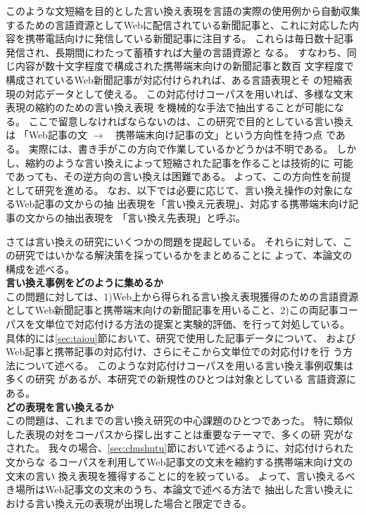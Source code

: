 \documentclass[jnlpbbl]{jnlp_j}
\begin{document}
このような文短縮を目的とした言い換え表現を言語の実際の使用例から自動収集
するための言語資源としてWebに配信されている新聞記事と、これに対応した内
容を携帯電話向けに発信している新聞記事に注目する。
これらは毎日数十記事発信され、長期間にわたって蓄積すれば大量の言語資源と
なる。
すなわち、同じ内容が数十文字程度で構成された携帯端末向けの新聞記事と数百
文字程度で構成されているWeb新聞記事が対応付けられれば、ある言語表現とそ
の短縮表現の対応データとして使える。
この対応付けコーパスを用いれば、多様な文末表現の縮約のための言い換え表現
を機械的な手法で抽出することが可能になる。
ここで留意しなければならないのは、この研究で目的としている言い換えは
「Web記事の文 $\rightarrow$　携帯端末向け記事の文」という方向性を持つ点
である。
実際には、書き手がこの方向で作業しているかどうかは不明である。
しかし、縮約のような言い換えによって短縮された記事を作ることは技術的に
可能であっても、その逆方向の言い換えは困難である。
よって、この方向性を前提として研究を進める。
なお、以下では必要に応じて、言い換え操作の対象になるWeb記事の文からの抽
出表現を「言い換え元表現」、対応する携帯端末向け記事の文からの抽出表現を
「言い換え先表現」と呼ぶ。

さて\cite{inui02}は言い換えの研究にいくつかの問題を提起している。
それらに対して、この研究ではいかなる解決策を採っているかをまとめることに
よって、本論文の構成を述べる。\\

\noindent \textbf{言い換え事例をどのように集めるか}\\
この問題に対しては、1)Web上から得られる言い換え表現獲得のための言語資源
としてWeb新聞記事と携帯端末向けの新聞記事を用いること、2)この両記事コー
パスを文単位で対応付ける方法の提案と実験的評価、を行って対処している。
具体的には\ref{sec:taiou}節において、研究で使用した記事データについて、
およびWeb記事と携帯記事の対応付け、さらにそこから文単位での対応付けを行
う方法について述べる。
このような対応付けコーパスを用いる言い換え事例収集は多くの研究
\cite{braz01,sekine01}があるが、本研究での新規性のひとつは対象としている
言語資源にある。
\\

\noindent \textbf{どの表現を言い換えるか}\\
この問題は、これまでの言い換え研究の中心課題のひとつであった。
特に類似した表現の対をコーパスから探し出すことは重要なテーマで、多くの研
究\cite{murata01,torisawa01,terada01}がなされた。
我々の場合、\ref{sec:chushutu}節において述べるように、対応付けられた文からな
るコーパスを利用してWeb記事文の文末を縮約する携帯端末向け文の文末の言い
換え表現を獲得することに的を絞っている。
よって、言い換えるべき場所はWeb記事文の文末のうち、本論文で述べる方法で
抽出した言い換えにおける言い換え元の表現が出現した場合と限定できる。
\\
\end{document}

